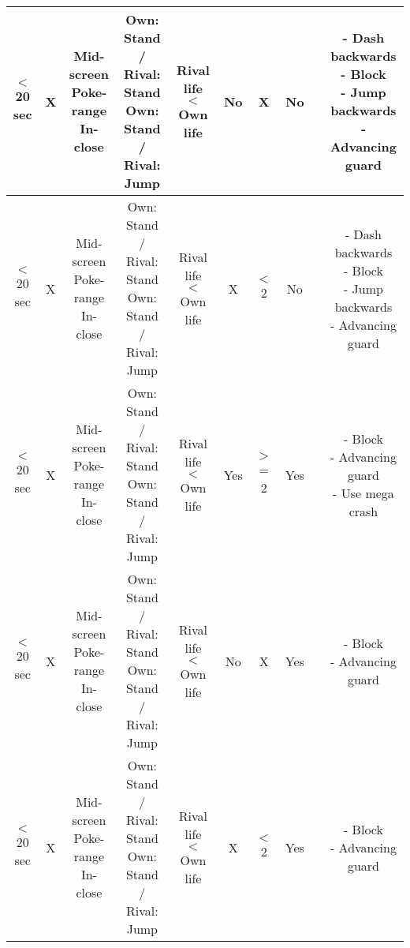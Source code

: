 \documentclass{article}
\begin{document}
\begin{landscape}
\begin{table}[h!]
\begin{center}
\begin{tabular*}{27cm}{c|c|c|c|c|c|c|c|c|c}
      \hline
      $<$ 20 sec & X & \makecell{Mid-screen \\ Poke-range \\ In-close} & \makecell{Own: Stand / Rival: Stand \\ Own: Stand / Rival: Jump} & Rival life $<$ Own life & No & X & No & & \makecell{- Dash backwards \\ - Block \\ - Jump backwards \\ - Advancing guard}\\
      \hline
      $<$ 20 sec & X & \makecell{Mid-screen \\ Poke-range \\ In-close} & \makecell{Own: Stand / Rival: Stand \\ Own: Stand / Rival: Jump} & Rival life $<$ Own life & X & $<$ 2 & No & & \makecell{- Dash backwards \\ - Block \\ - Jump backwards \\ - Advancing guard}\\
      \hline
      $<$ 20 sec & X & \makecell{Mid-screen \\ Poke-range \\ In-close} & \makecell{Own: Stand / Rival: Stand \\ Own: Stand / Rival: Jump} & Rival life $<$ Own life & Yes & $>$= 2 & Yes & & \makecell{- Block \\ - Advancing guard \\ - Use mega crash}\\
      \hline
      $<$ 20 sec & X & \makecell{Mid-screen \\ Poke-range \\ In-close} & \makecell{Own: Stand / Rival: Stand \\ Own: Stand / Rival: Jump} & Rival life $<$ Own life & No & X & Yes & & \makecell{- Block \\ - Advancing guard}\\
      \hline
      $<$ 20 sec & X & \makecell{Mid-screen \\ Poke-range \\ In-close} & \makecell{Own: Stand / Rival: Stand \\ Own: Stand / Rival: Jump} & Rival life $<$ Own life & X & $<$ 2 & Yes & & \makecell{- Block \\ - Advancing guard}\\
      \hline
    \end{tabular*}
  \end{center}
\end{table}

\end{landscape}
\end{document}
